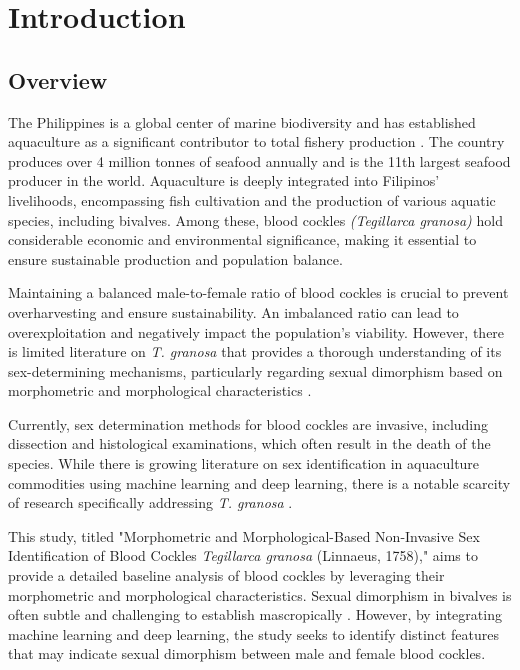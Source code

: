 \chapter{Introduction}
\label{sec:researchdesc}    %

\section{Overview}
\label{sec:overview}

The Philippines is a global center of marine biodiversity and has established aquaculture as a significant contributor to total fishery production \cite{aypa2000, bfar2019}. The country produces over 4 million tonnes of seafood annually and is the 11th largest seafood producer in the world. Aquaculture is deeply integrated into Filipinos' livelihoods, encompassing fish cultivation and the production of various aquatic species, including bivalves. Among these, blood cockles \textit{(Tegillarca granosa)} hold considerable economic and environmental significance, making it essential to ensure sustainable production and population balance.

Maintaining a balanced male-to-female ratio of blood cockles is crucial to prevent overharvesting and ensure sustainability. An imbalanced ratio can lead to overexploitation and negatively impact the population's viability. However, there is limited literature on \textit{T. granosa} that provides a thorough understanding of its sex-determining mechanisms, particularly regarding sexual dimorphism based on morphometric and morphological characteristics \cite{breton2017sex}.

Currently, sex determination methods for blood cockles are invasive, including dissection and histological examinations, which often result in the death of the species. While there is growing literature on sex identification in aquaculture commodities using machine learning and deep learning, there is a notable scarcity of research specifically addressing \textit{T. granosa} \cite{miranda2023}.

This study, titled "Morphometric and Morphological-Based Non-Invasive Sex Identification of Blood Cockles \textit{Tegillarca granosa} (Linnaeus, 1758)," aims to provide a detailed baseline analysis of blood cockles by leveraging their morphometric and morphological characteristics. Sexual dimorphism in bivalves is often subtle and challenging to establish mascropically \cite{karapunar2021}. However, by integrating machine learning and deep learning, the study seeks to identify distinct features that may indicate sexual dimorphism between male and female blood cockles.

